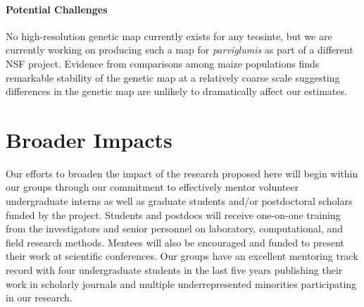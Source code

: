\paragraph{Potential Challenges} 
No high-resolution genetic map currently exists for any teosinte, but we are currently working on producing such a map for \emph{parviglumis} as part of a different NSF project.
Evidence from comparisons among maize populations finds remarkable stability of the genetic map at a relatively coarse scale \citep{rodgers2015recombination} suggesting differences in the genetic map are unlikely to dramatically affect our estimates. 

\section*{Broader Impacts} 

Our efforts to broaden the impact of the research proposed here will begin within our groups through our commitment to effectively mentor volunteer undergraduate interns as well as graduate students and/or postdoctoral scholars funded by the project. Students and postdocs will receive one-on-one training from the investigators and senior personnel on laboratory, computational, and field research methods.  Mentees will also be encouraged and funded to present their work at scientific conferences.  Our groups have an excellent mentoring track record with four undergraduate students in the last five years publishing their work in scholarly journals and multiple underrepresented minorities participating in our research.


